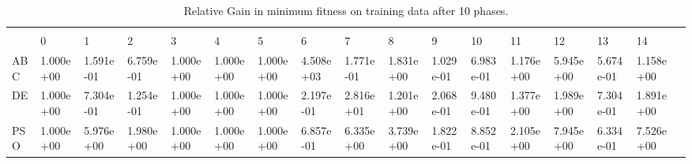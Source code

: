 \begin{landscape}
\begin{table}[]
\centering
\caption{Relative Gain in minimum fitness on training data after 10 phases.}
\label{table:10phasemintrain}
\begin{adjustbox}{width=1.7\textwidth}
\begin{tabular}{lllllllllllllllll}
     &           &           &           &           &           &           &           &           &           &           &           &           &           &           &           &  \\
 & 0         & 1         & 2         & 3         & 4         & 5         & 6         & 7         & 8         & 9         & 10        & 11        & 12        & 13        & 14        &  \\
ABC                 & 1.000e+00 & 1.591e-01 & 6.759e-01 & 1.000e+00 & 1.000e+00 & 1.000e+00 & 4.508e+03 & 1.771e-01 & 1.831e+00 & 1.029e-01 & 6.983e-01 & 1.176e+00 & 5.945e+00 & 5.674e-01 & 1.158e+00 &  \\
DE                  & 1.000e+00 & 7.304e-01 & 1.254e-01 & 1.000e+00 & 1.000e+00 & 1.000e+00 & 2.197e-01 & 2.816e+01 & 1.201e+00 & 2.068e-01 & 9.480e-01 & 1.377e+00 & 1.989e+00 & 7.304e-01 & 1.891e+00 &  \\
PSO                 & 1.000e+00 & 5.976e+00 & 1.980e+00 & 1.000e+00 & 1.000e+00 & 1.000e+00 & 6.857e-01 & 6.335e+00 & 3.739e+00 & 1.822e-01 & 8.852e-01 & 2.105e+00 & 7.945e+00 & 6.334e-01 & 7.526e+00 &  \\

\end{tabular}
\end{adjustbox}
\end{table}


\end{landscape}

